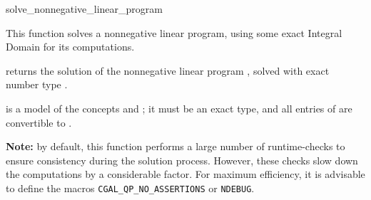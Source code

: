 \begin{ccRefFunction}{solve_nonnegative_linear_program}


This function solves a nonnegative linear program, using some exact
Integral Domain  for its computations.   

{returns the solution of the nonnegative linear program , solved
with exact number type .}

 is a model of the concepts  and
; it must
be an exact type, and all entries of  are convertible to 
.

{\bf Note:} by default, this function performs a large number of 
runtime-checks to ensure consistency during the solution process.
However, these checks slow down the computations by a considerable
factor. For maximum efficiency, it is advisable to define the macros
\texttt{CGAL\_QP\_NO\_ASSERTIONS} or \texttt{NDEBUG}.
\end{ccRefFunction}
